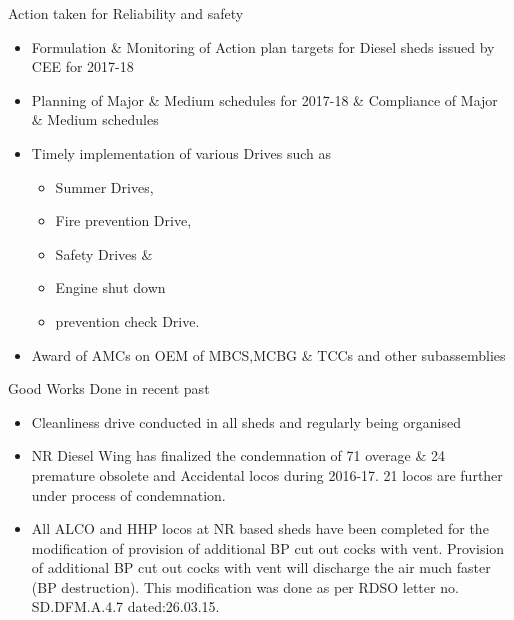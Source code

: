 \documentclass[
  ignorenonframetext,
]{beamer}
\providecommand{\tightlist}{%
  \setlength{\itemsep}{0pt}\setlength{\parskip}{0pt}}
\begin{document}
\begin{frame}{Action taken for Reliability and safety}
\protect\hypertarget{action-taken-for-reliability-and-safety}{}
\begin{itemize}[<+->]
\tightlist
\item
  Formulation \& Monitoring of Action plan targets for Diesel sheds
  issued by CEE for 2017-18
\item
  Planning of Major \& Medium schedules for 2017-18 \& Compliance of
  Major \& Medium schedules
\item
  Timely implementation of various Drives such as

  \begin{itemize}[<+->]
  \tightlist
  \item
    Summer Drives,
  \item
    Fire prevention Drive,
  \item
    Safety Drives \&
  \item
    Engine shut down
  \item
    prevention check Drive.
  \end{itemize}
\item
  Award of AMCs on OEM of MBCS,MCBG \& TCCs and other subassemblies
\end{itemize}
\end{frame}

\begin{frame}{Good Works Done in recent past}
\protect\hypertarget{good-works-done-in-recent-past}{}
\begin{itemize}[<+->]
\item
  Cleanliness drive conducted in all sheds and regularly being organised
\item
  NR Diesel Wing has finalized the condemnation of 71 overage \& 24
  premature obsolete and Accidental locos during 2016-17. 21 locos are
  further under process of condemnation.
\item
  All ALCO and HHP locos at NR based sheds have been completed for the
  modification of provision of additional BP cut out cocks with vent.
  Provision of additional BP cut out cocks with vent will discharge the
  air much faster (BP destruction). This modification was done as per
  RDSO letter no. SD.DFM.A.4.7 dated:26.03.15.
\end{itemize}
\end{frame}
\end{document}

